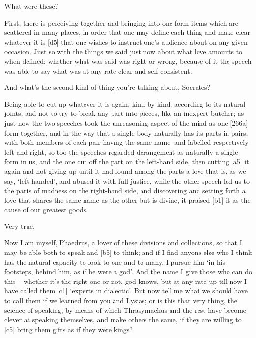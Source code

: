  What were these?

 First, there is perceiving together and bringing into one form
items which are scattered in many
places, in order that
one may define each thing and make clear whatever it is {[}d5{]} that
one wishes to instruct
one's audience about on any given occasion. Just so with the things we
said just now about what love amounts to when defined: whether what was
said was right or wrong, because of it the
speech was able to say
what was at any rate clear and self-consistent.

 And what's the second kind of thing you're talking about,
Socrates?

 Being able to cut up whatever it is again, kind by
kind, according to its
natural joints, and not to try to break any part into pieces, like an
inexpert butcher; as just now the two speeches took the unreasoning
aspect of the mind as one {[}266a{]} form together, and in the way that
a single body naturally has its parts in pairs, with both members of
each pair having the same name, and labelled respectively left and
right, so too the speeches regarded derangement as naturally a single
form in us, and the one cut off the part on the left-hand side, then
cutting {[}a5{]} it again and not giving up until it had found among the
parts a love that is, as we say, ‘left-handed', and abused it with full
justice, while the other speech led us to the parts of madness on the
right-hand side, and discovering and setting forth a love that shares
the same name as the other but is divine, it praised {[}b1{]} it as the
cause of our greatest goods.

 Very true.

 Now I am myself, Phaedrus, a lover of these divisions and
collections, so that I may be able both to speak and {[}b5{]} to think;
and if I find anyone else who I think has the natural capacity to look
to one and to many, I
pursue him ‘in his footsteps, behind him, as if he were a
god'. And the name I
give those who can do this -- whether it's the right one or not, god
knows, but at any rate
up till now I have called them {[}c1{]} ‘experts in
dialectic'. But now tell
me what we should have to call them if we learned from you and Lysias;
or is this that very thing, the science of speaking, by means of which
Thrasymachus and the rest have become clever at speaking themselves, and
make others the same, if they are willing to {[}c5{]} bring them gifts
as if they were kings?

